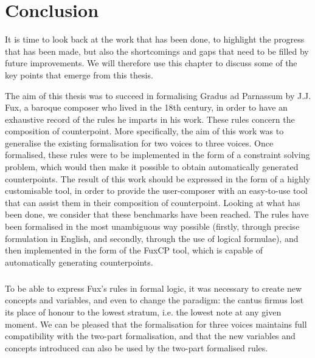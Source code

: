 \chapter*{Conclusion}\label{chapter:Conclusion}
It is time to look back at the work that has been done, to highlight the progress that has been made, but also the shortcomings and gaps that need to be filled by future improvements. We will therefore use this chapter to discuss some of the key points that emerge from this thesis.

The aim of this thesis was to succeed in formalising Gradus ad Parnassum by J.J. Fux, a baroque composer who lived in the 18th century, in order to have an exhaustive record of the rules he imparts in his work. These rules concern the composition of counterpoint. More specifically, the aim of this work was to generalise the existing formalisation for two voices to three voices. Once formalised, these rules were to be implemented in the form of a constraint solving problem, which would then make it possible to obtain automatically generated counterpoints. The result of this work should be expressed in the form of a highly customisable tool, in order to provide the user-composer with an easy-to-use tool that can assist them in their composition of counterpoint. Looking at what has been done, we consider that these benchmarks have been reached. The rules have been formalised in the most unambiguous way possible (firstly, through precise formulation in English, and secondly, through the use of logical formulae), and then implemented in the form of the FuxCP tool, which is capable of automatically generating counterpoints. 

\paragraph{}
To be able to express Fux's rules in formal logic, it was necessary to create new concepts and variables, and even to change the paradigm: the cantus firmus lost its place of honour to the lowest stratum, i.e. the lowest note at any given moment. We can be pleased that the formalisation for three voices maintains full compatibility with the two-part formalisation, and that the new variables and concepts introduced can also be used by the two-part formalised rules.



